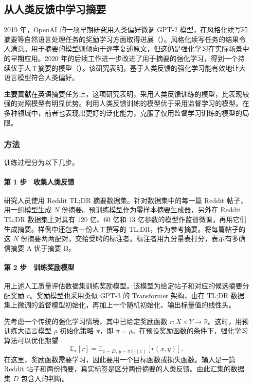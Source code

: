 \subsection{从人类反馈中学习摘要}
2019 年，OpenAI 的一项早期研究用人类偏好微调 GPT-2 模型，在风格化续写和摘要等自然语言处理任务的奖励学习方面取得进展（）。风格化续写任务的结果令人满意。用于摘要的模型则倾向于逐字复述原文，但这仍是强化学习在实际场景中的早期应用。2020 年的后续工作进一步改进了用于摘要的强化学习，得到一个持续优于人工摘要的模型（）。该研究表明，基于人类反馈的强化学习能有效地让大语言模型符合人类偏好。

\begin{keypoint}
\noindent\textbf{主要贡献}\quad 在英语摘要任务上，这项研究表明，采用人类反馈训练的模型，比表现较强的对照模型有明显优势。利用人类反馈训练的模型优于采用监督学习的模型。在多种领域中，前者也表现出更好的泛化能力，克服了仅用监督学习训练的模型的局限。
\end{keypoint}

\subsubsection{方法}
训练过程分为以下几步。

\paragraph*{第 1 步　收集人类反馈}
研究人员使用 Reddit TL;DR 摘要数据集。针对数据集中的每一篇 Reddit 帖子，用一组模型生成 $N$ 份摘要。预训练模型作为零样本摘要生成器，另外在 Reddit TL;DR 数据集上对具有 120 亿、60 亿和 13 亿参数的模型作监督微调，再用它们生成摘要。样例中还包含一份人工撰写的 TL;DR，作为参考摘要。将每篇帖子的这 $N$ 份摘要两两配对，交给受聘的标注者。标注者用九分量表打分，表示有多确信摘要 A 优于摘要 B。

\paragraph*{第 2 步　训练奖励模型}
用上述人工质量评估数据集训练奖励模型。该模型为给定帖子和对应的候选摘要分配奖励 $r$。奖励模型也采用类似 GPT-3 的 Transformer 架构，由在 TL;DR 数据集上微调的监督模型初始化，再加上一个随机初始化、输出标量值的线性头。

先考虑一个传统的强化学习情境，其中已给定奖励函数 $r\colon X\times Y\to\mathbb{R}$。这时，用预训练大语言模型 $\rho$ 初始化策略 $\pi$，即 $\pi=\rho$。在预设奖励函数的条件下，强化学习算法可以优化期望
\[
\mathbb{E}_{\pi}[r]=\mathbb{E}_{x\sim D,\,y\sim\pi(\cdot\mid x)}[r(x,y)].
\]
在这里，奖励函数需要学习，因此要用一个目标函数或损失函数。输入是一篇 Reddit 帖子和两份摘要，真实标签是区分两份摘要的人类反馈。由此汇集的数据集 $D$ 包含人的判断。

